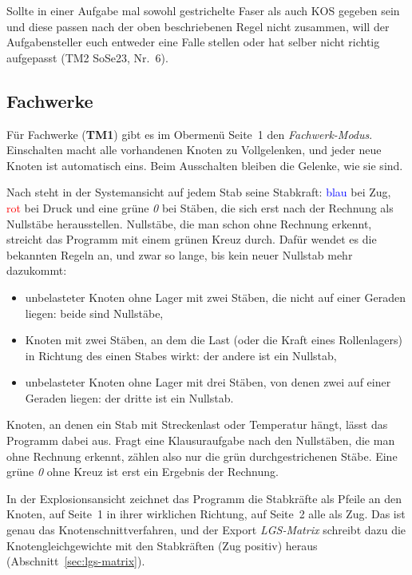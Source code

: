 Sollte in einer Aufgabe mal sowohl gestrichelte Faser als auch KOS gegeben sein und diese passen nach der oben beschriebenen Regel
nicht zusammen, will der Aufgabensteller euch entweder eine Falle stellen oder hat selber nicht richtig aufgepasst (TM2 SoSe23, Nr.~6).

\subsection{Fachwerke}\label{sec:fachwerk}

Für Fachwerke (\textbf{TM1}) gibt es im Obermenü Seite~1 den \emph{Fachwerk-Modus}. Einschalten
macht alle vorhandenen Knoten zu Vollgelenken, und jeder neue Knoten ist automatisch eins. Beim
Ausschalten bleiben die Gelenke, wie sie sind.

Nach  steht in der Systemansicht auf jedem Stab seine Stabkraft: \textcolor{blue}{blau}
bei Zug, \textcolor{red}{rot} bei Druck und eine grüne \emph{0} bei Stäben, die sich erst nach der
Rechnung als Nullstäbe herausstellen. Nullstäbe, die man schon ohne Rechnung erkennt, streicht das
Programm mit einem grünen Kreuz durch. Dafür wendet es die bekannten Regeln an, und zwar so lange,
bis kein neuer Nullstab mehr dazukommt:

\begin{itemize}
  \item unbelasteter Knoten ohne Lager mit zwei Stäben, die nicht auf einer Geraden liegen: beide
        sind Nullstäbe,
  \item Knoten mit zwei Stäben, an dem die Last (oder die Kraft eines Rollenlagers) in Richtung
        des einen Stabes wirkt: der andere ist ein Nullstab,
  \item unbelasteter Knoten ohne Lager mit drei Stäben, von denen zwei auf einer Geraden liegen:
        der dritte ist ein Nullstab.
\end{itemize}

Knoten, an denen ein Stab mit Streckenlast oder Temperatur hängt, lässt das Programm dabei aus.
Fragt eine Klausuraufgabe nach den Nullstäben, die man ohne Rechnung erkennt, zählen also nur die
grün durchgestrichenen Stäbe. Eine grüne \emph{0} ohne Kreuz ist erst ein Ergebnis der Rechnung.

In der Explosionsansicht zeichnet das Programm die Stabkräfte als Pfeile an den Knoten, auf
Seite~1 in ihrer wirklichen Richtung, auf Seite~2 alle als Zug. Das ist genau das
Knotenschnittverfahren, und der Export \emph{LGS-Matrix} schreibt dazu die Knotengleichgewichte mit
den Stabkräften  (Zug positiv) heraus (Abschnitt~\ref{sec:lgs-matrix}).

